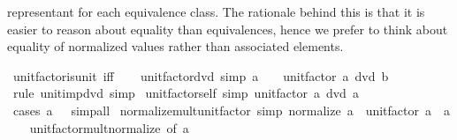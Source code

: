 \begin{isabellebody}
\begin{isamarkuptext}
  representant for each equivalence class. The rationale behind this is that
  it is easier to reason about equality than equivalences, hence we prefer to
  think about equality of normalized values rather than associated elements.%
\end{isamarkuptext}\isamarkuptrue%
\isamarkupfalse%
\ unit{\isacharunderscore}{\kern0pt}factor{\isacharunderscore}{\kern0pt}is{\isacharunderscore}{\kern0pt}unit\ {\isacharbrackleft}{\kern0pt}iff{\isacharbrackright}{\kern0pt}\isanewline
\ \ \isanewline
{}\isamarkupfalse%
\ unit{\isacharunderscore}{\kern0pt}factor{\isacharunderscore}{\kern0pt}dvd\ {\isacharbrackleft}{\kern0pt}simp{\isacharbrackright}{\kern0pt}{\isacharcolon}{\kern0pt}\ {\isachardoublequoteopen}a\ {\isasymnoteq}\ {}\ {\isasymLongrightarrow}\ unit{\isacharunderscore}{\kern0pt}factor\ a\ dvd\ b{\isachardoublequoteclose}\isanewline
%
\isadelimproof
\ \ %
\endisadelimproof
%
\isatagproof
{}\isamarkupfalse%
\ {\isacharparenleft}{\kern0pt}rule\ unit{\isacharunderscore}{\kern0pt}imp{\isacharunderscore}{\kern0pt}dvd{\isacharparenright}{\kern0pt}\ simp%
\endisatagproof
{\isafoldproof}%
%
\isadelimproof
\isanewline
%
\endisadelimproof
\isanewline
{}\isamarkupfalse%
\ unit{\isacharunderscore}{\kern0pt}factor{\isacharunderscore}{\kern0pt}self\ {\isacharbrackleft}{\kern0pt}simp{\isacharbrackright}{\kern0pt}{\isacharcolon}{\kern0pt}\ {\isachardoublequoteopen}unit{\isacharunderscore}{\kern0pt}factor\ a\ dvd\ a{\isachardoublequoteclose}\isanewline
%
\isadelimproof
\ \ %
\endisadelimproof
%
\isatagproof
{}\isamarkupfalse%
\ {\isacharparenleft}{\kern0pt}cases\ {\isachardoublequoteopen}a\ {\isacharequal}{\kern0pt}\ {}{\isachardoublequoteclose}{\isacharparenright}{\kern0pt}\ simp{\isacharunderscore}{\kern0pt}all%
\endisatagproof
{\isafoldproof}%
%
\isadelimproof
\isanewline
%
\endisadelimproof
\isanewline
{}\isamarkupfalse%
\ normalize{\isacharunderscore}{\kern0pt}mult{\isacharunderscore}{\kern0pt}unit{\isacharunderscore}{\kern0pt}factor\ {\isacharbrackleft}{\kern0pt}simp{\isacharbrackright}{\kern0pt}{\isacharcolon}{\kern0pt}\ {\isachardoublequoteopen}normalize\ a\ {\isacharasterisk}{\kern0pt}\ unit{\isacharunderscore}{\kern0pt}factor\ a\ {\isacharequal}{\kern0pt}\ a{\isachardoublequoteclose}\isanewline
%
\isadelimproof
\ \ %
\endisadelimproof
%
\isatagproof
{}\isamarkupfalse%
\ unit{\isacharunderscore}{\kern0pt}factor{\isacharunderscore}{\kern0pt}mult{\isacharunderscore}{\kern0pt}normalize\ {\isacharbrackleft}{\kern0pt}of\ a{\isacharbrackright}{\kern0pt}\ \isamarkupfalse%

\end{isabellebody}
